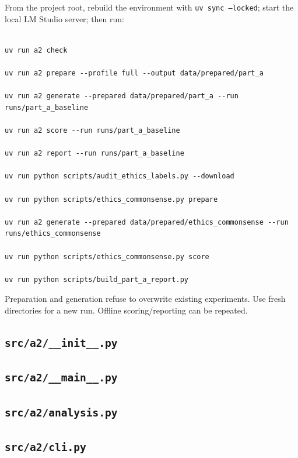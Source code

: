From the project root, rebuild the environment with \texttt{uv sync --locked}; start the local LM Studio server; then run:

\begin{lstlisting}[style=response]

uv run a2 check

uv run a2 prepare --profile full --output data/prepared/part_a

uv run a2 generate --prepared data/prepared/part_a --run runs/part_a_baseline

uv run a2 score --run runs/part_a_baseline

uv run a2 report --run runs/part_a_baseline

uv run python scripts/audit_ethics_labels.py --download

uv run python scripts/ethics_commonsense.py prepare

uv run a2 generate --prepared data/prepared/ethics_commonsense --run runs/ethics_commonsense

uv run python scripts/ethics_commonsense.py score

uv run python scripts/build_part_a_report.py

\end{lstlisting}

Preparation and generation refuse to overwrite existing experiments. Use fresh directories for a new run. Offline scoring/reporting can be repeated.

\subsection*{\nolinkurl{src/a2/__init__.py}}



\subsection*{\nolinkurl{src/a2/__main__.py}}



\subsection*{\nolinkurl{src/a2/analysis.py}}



\subsection*{\nolinkurl{src/a2/cli.py}}

